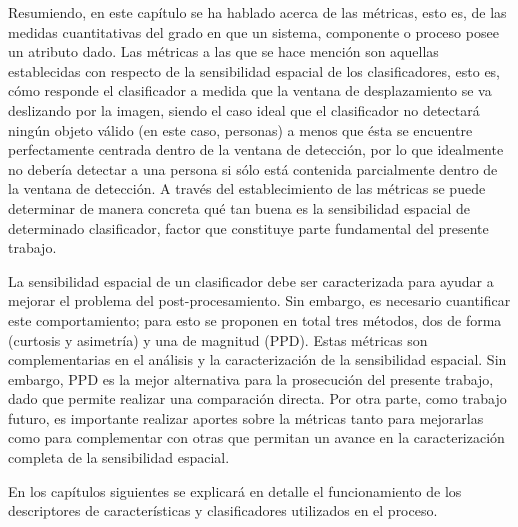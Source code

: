 Resumiendo, en este capítulo se ha hablado acerca de las métricas, esto es, de las medidas cuantitativas del grado en que un sistema, componente o proceso posee un atributo dado. Las métricas a las que se hace mención son aquellas establecidas con respecto de la sensibilidad espacial de los clasificadores, esto es, cómo responde el clasificador a medida que la ventana de desplazamiento se va deslizando por la imagen, siendo el caso ideal que el clasificador no detectará ningún objeto válido (en este caso, personas) a menos que ésta se encuentre perfectamente centrada dentro de la ventana de detección, por lo que idealmente no debería detectar a una persona si sólo está contenida parcialmente dentro de la ventana de detección. A través del establecimiento de las métricas se puede determinar de manera concreta qué tan buena es la sensibilidad espacial de determinado clasificador, factor que constituye parte fundamental del presente trabajo. 

La sensibilidad espacial de un clasificador debe ser caracterizada para ayudar a mejorar el problema del post-procesamiento. Sin embargo, es necesario cuantificar este comportamiento; para esto se proponen en total tres métodos, dos de forma (curtosis y asimetría) y una de magnitud (PPD). Estas métricas son complementarias en el análisis y la caracterización de la sensibilidad espacial. Sin embargo, PPD es la mejor alternativa para la prosecución del presente trabajo, dado que permite realizar una comparación directa. Por otra parte, como trabajo futuro, es importante realizar aportes sobre la métricas tanto para mejorarlas como para complementar con otras que permitan un avance en la caracterización completa de la sensibilidad espacial.

En los capítulos siguientes se explicará en detalle el funcionamiento de los descriptores de características y clasificadores utilizados en el proceso.